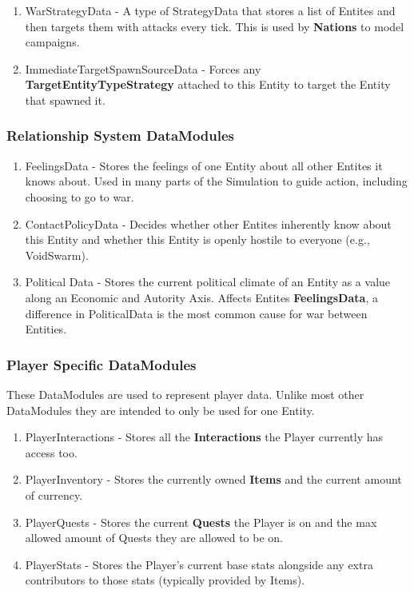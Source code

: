 \documentclass{report}
\begin{document}
\begin{enumerate}
	\item WarStrategyData - A type of StrategyData that stores a list of Entites and then targets them with attacks every tick. This is used by \textbf{Nations} to model campaigns.

	\item ImmediateTargetSpawnSourceData - Forces any \textbf{TargetEntityTypeStrategy} attached to this Entity to target the Entity that spawned it.

\end{enumerate}

\subsubsection{Relationship System DataModules}

\begin{enumerate}
 
	\item FeelingsData - Stores the feelings of one Entity about all other Entites it knows about. Used in many parts of the Simulation to guide action, including choosing to go to war.
	\item ContactPolicyData - Decides whether other Entites inherently know about this Entity and whether this Entity is openly hostile to everyone (e.g., VoidSwarm).
	\item Political Data - Stores the current political climate of an Entity as a value along an Economic and Autority Axis. Affects Entites \textbf{FeelingsData}, a difference in PoliticalData is the most common cause for war between Entities.

\end{enumerate}

\subsubsection{Player Specific DataModules}

These DataModules are used to represent player data. Unlike most other DataModules they are intended to only be used for one Entity.
 
\begin{enumerate}

	\item PlayerInteractions - Stores all the \textbf{Interactions} the Player currently has access too.
	\item PlayerInventory - Stores the currently owned \textbf{Items} and the current amount of currency.
	\item PlayerQuests - Stores the current \textbf{Quests} the Player is on and the max allowed amount of Quests they are allowed to be on.
	\item PlayerStats - Stores the Player's current base stats alongside any extra contributors to those stats (typically provided by Items).

\end{enumerate}
\end{document}
